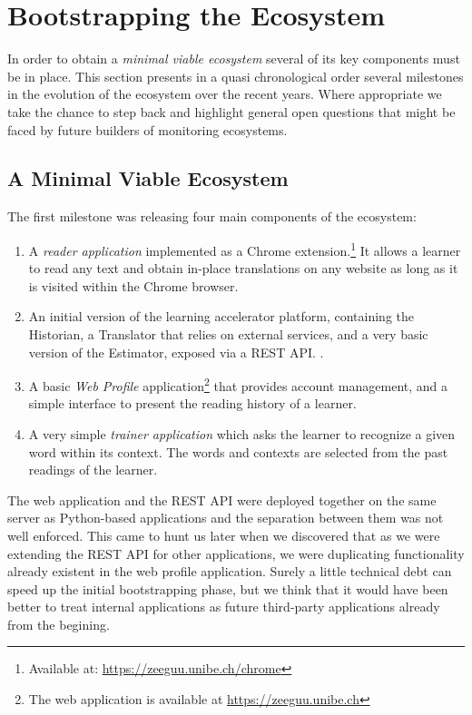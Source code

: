 

\section {Bootstrapping the Ecosystem}

In order to obtain a {\em minimal viable ecosystem} several of its key components must be in place. This section presents in a quasi chronological order several milestones in the evolution of the  ecosystem over the recent years. Where appropriate we take the chance to step back and highlight general open questions that might be faced by future builders of monitoring ecosystems. 

\subsection {A Minimal Viable Ecosystem}
The first milestone was releasing four main components of the ecosystem: 

\begin{enumerate}
	\item A {\em reader application} implemented as a Chrome extension.\footnote{Available at: \url{https://zeeguu.unibe.ch/chrome}} It allows a learner to read any text and obtain in-place translations on any website as long as it is visited within the Chrome browser. 

	\item An initial version of the learning accelerator platform, containing the Historian, a Translator that relies on external services, and a very basic version of the Estimator, exposed via a REST API. \cite{Lung16zeeguu}. 

	\item A basic {\em Web Profile} application\footnote{The web application is available at \url{https://zeeguu.unibe.ch}} that provides account management, and a simple interface to present the reading history of a learner. 

	\item A very simple {\em trainer application} which asks the learner to recognize a given word within its context. The words and contexts are selected from the past readings of the learner.

\end{enumerate}

The web application and the REST API were deployed together on the same server as Python-based applications and the separation between them was not well enforced. This came to hunt us later when we discovered that as we were extending the REST API for other applications, we were duplicating functionality already existent in the web profile application. Surely a little technical debt can speed up the initial bootstrapping phase, but we think that it would have been better to treat internal applications as future third-party applications already from the begining.  


